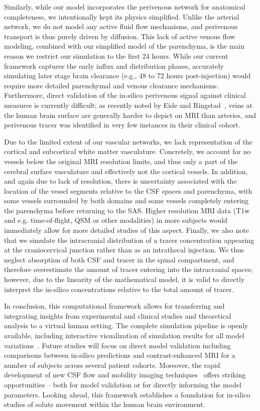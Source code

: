 \documentclass[fleqn,10pt]{wlscirep}
\begin{document}
Similarly, while our model incorporates the perivenous network for anatomical completeness, we intentionally kept its physics simplified. Unlike the arterial network, we do not model any active fluid flow mechanisms, and perivenous transport is thus purely driven by diffusion.
This lack of active venous flow modeling, combined with our simplified model of the parenchyma, is the main reason  we restrict our simulation to the first 24 hours. 
While our current framework captures the early influx and distribution phases, accurately 
simulating later stage brain clearance (e.g., 48 to 72 hours post-injection) 
would require more detailed parenchymal and venous clearance mechanisms. 
Furthermore, direct validation of the in-silico perivenous signal against 
clinical measures is currently difficult; as recently noted by Eide and 
Ringstad~\cite{eide2024functional}, veins at the human brain surface are 
generally harder to depict on MRI than arteries, and perivenous tracer 
was identified in very few instances in their clinical cohort.

Due to the limited extent of our vascular networks, we lack
representation of the cortical and subcortical white matter
vasculature. Concretely, we account for no vessels below the original
MRI resolution limits, and thus only a part of the cerebral surface
vasculature and effectively not the cortical vessels. In addition, and
again due to lack of resolution, there is uncertainty associated with
the location of the vessel segments relative to the CSF spaces and
parenchyma, with some vessels surrounded by both domains and some
vessels completely entering the parenchyma before returning to the
SAS. Higher resolution MRI data (T1w and e.g. time-of-flight, QSM or
other modalities) in more subjects would immediately allow for more
detailed studies of this aspect. Finally, we also note that we
simulate the intracranial distribution of a tracer concentration
appearing at the craniocervical junction rather than as an intrathecal
injection. We thus neglect absorption of both CSF and tracer in the
spinal compartment, and therefore overestimate the amount of tracer
entering into the intracranial spaces; however, due to the linearity
of the mathematical model, it is valid to directly interpret the
in-silico concentrations relative to the total amount of tracer.

In conclusion, this computational framework allows for transferring
and integrating insights from experimental and clinical studies and
theoretical analysis to a virtual human setting. The complete
simulation pipeline is openly available, including interactive
visualization of simulation results for all model
variations~\cite{ZENODO}. Future studies will focus on direct model
validation including comparisons between in-silico predictions and
contrast-enhanced MRI for a number of subjects across several patient
cohorts. Moreover, the rapid development of new CSF flow and mobility
imaging techniques~\cite{dong2025quantifying, hirschler2025region,
  vikner2025imaging} offers striking opportunities -- both for model
validation or for directly informing the model parameters. Looking
ahead, this framework establishes a foundation for in-silico studies
of solute movement within the human brain environment.
\end{document}
